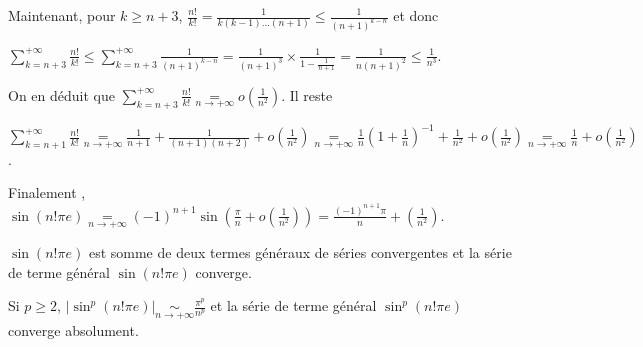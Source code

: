 {{Maintenant, pour $k\geqslant n+3$, $\frac{n!}{k!}=\frac{1}{k(k-1)\ldots(n+1)}\leqslant\frac{1}{(n+1)^{k-n}}$ et donc

\begin{center} 
$\sum_{k=n+3}^{+\infty}\frac{n!}{k!}\leqslant\sum_{k=n+3}^{+\infty}\frac{1}{(n+1)^{k-n}}=\frac{1}{(n+1)^3}\times\frac{1}{1-\frac{1}{n+1}}=\frac{1}{n(n+1)^2}\leqslant\frac{1}{n^3}$.
\end{center}

On en déduit que $\sum_{k=n+3}^{+\infty}\frac{n!}{k!}\underset{n\rightarrow+\infty}{=}o\left(\frac{1}{n^2}\right)$. Il reste

\begin{center}
$\sum_{k=n+1}^{+\infty}\frac{n!}{k!}\underset{n\rightarrow+\infty}{=}
\frac{1}{n+1}+\frac{1}{(n+1)(n+2)}+o\left(\frac{1}{n^2}\right)\underset{n\rightarrow+\infty}{=}\frac{1}{n}\left(1+\frac{1}{n}\right)^{-1}+\frac{1}{n^2}+o\left(\frac{1}{n^2}\right)
\underset{n\rightarrow+\infty}{=}\frac{1}{n}+o\left(\frac{1}{n^2}\right)
$.
\end{center}

Finalement , $\sin(n!\pi e)\underset{n\rightarrow+\infty}{=}(-1)^{n+1}\sin\left(\frac{\pi}{n}+o\left(\frac{1}{n^2}\right)\right)=\frac{(-1)^{n+1}\pi}{n}+\left(\frac{1}{n^2}\right)$.

$\sin(n!\pi e)$ est somme de deux termes généraux de séries convergentes et la série de terme général $\sin(n!\pi e)$ converge.

Si $p\geqslant2$, $|\sin^p(n!\pi e)|\underset{n\rightarrow+\infty}{\sim}\frac{\pi^p}{n^p}$ et la série de terme général $\sin^p(n!\pi e)$ converge absolument.
}
}
